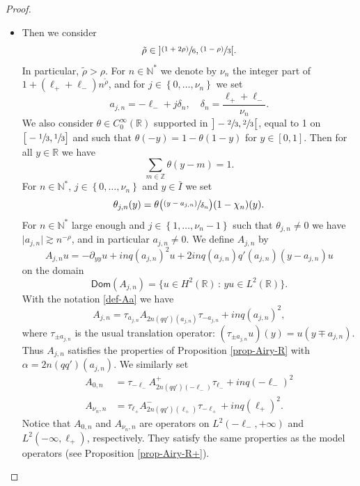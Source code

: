 \documentclass[10pt]{amsart}
\newcommand{\psfrac}[2]{\sfrac{(#1)}{#2}}
\theoremstyle{plain}
\theoremstyle{definition}
\newcommand{\abs}[1]{\vert #1\vert}
\newcommand{\set}[1]{\{ #1\}}
\newcommand{\Ii}[2] {\left\{ #1,\dots,#2 \right\}}
\newcommand{\1}{\mathds 1}
\newcommand{\st}{\,:\,}
\newcommand{\Dom}{\mathsf{Dom}}
\newcommand{\R}{\mathbb{R}}
\newcommand{\N}{\mathbb{N}}
\newcommand{\Z}{\mathbb{Z}}
\let\a\alpha
\let\d\delta
\let\th\theta
\begin{document}
\begin{proof}
\begin{itemize}
\item
Then we consider
\[
\tilde \rho \in {}] \psfrac {1+2\rho} 6, \psfrac {1-\rho} 3[.
\]
In particular, $\tilde \rho > \rho$. For $n \in \N^*$ we denote by $\nu_n$ the integer part of $1+ (\ell_+ + \ell_-) n^{\tilde \rho}$, and for $j \in \Ii 0 {\nu_n}$ we set
\[
a_{j,n} = -\ell_- + j \d_n, \quad \d_n = \frac {\ell_+ + \ell_-}{\nu_n}.
\]
We also consider $\theta \in C_0^\infty(\R)$ supported in $\big]-\sfrac 23,\sfrac 23\big[$, equal to 1 on $\big[-\sfrac 13,\sfrac 13\big]$ and such that $\th(-y) = 1-\th(1-y)$ for $y \in [0,1]$. Then for all $y \in \R$ we have
\[
\sum_{m \in \Z} \theta(y-m) = 1.
\]
For $n \in \N^*$, $j \in \Ii 0 {\nu_n}$ and $y \in \bar I$ we set
\[
\theta_{j,n}(y) = \theta \bigl(\psfrac {y-a_{j,n}}{\d_n} \bigr) (1-\chi_n)(y).
\]
For $n \in \N^*$ large enough and $j \in \Ii 1 {\nu_n-1}$ such that $\th_{j,n} \neq 0$ we have \hbox{$\abs{a_{j,n}} \gtrsim n^{-\rho}$}, and in particular $a_{j,n}\neq 0$. We define $A_{j,n}$ by
\[
A_{j,n} u = -\partial_{yy} u + in q(a_{j,n})^2 u + 2 i n q(a_{j,n}) q'(a_{j,n}) (y-a_{j,n}) u
\]
on the domain
\[
\Dom(A_{j,n}) = \set{u \in H^2(\R) \st y u \in L^2(\R)}.
\]
With the notation \eqref{def-Aa} we have
\[
A_{j,n} = \tau_{a_{j,n}} A_{2n(qq')(a_{j,n})} \tau_{-a_{j,n}} + i n q(a_{j,n})^2,
\]
where $\tau_{\pm a_{j,n}}$ is the usual translation operator: $(\tau_{\pm a_{j,n}} u)(y) = u(y \mp a_{j,n})$. Thus $A_{j,n}$ satisfies the properties of Proposition \ref{prop-Airy-R} with $\a = 2n (qq')(a_{j,n})$. We similarly set
\begin{align*}
A_{0,n} &= \tau_{-\ell_-} A_{2n(qq')(-\ell_-)}^+ \tau_{\ell_-} + i n q(-\ell_-)^2
\\
\tag*{and}
A_{\nu_n,n} &= \tau_{\ell_+} A_{2n(qq')(\ell_+)}^- \tau_{-\ell_+} + i n q(\ell_+)^2.
\end{align*}
Notice that $A_{0,n}$ and $A_{\nu_n,n}$ are operators on $L^2(-\ell_-,+\infty)$ and $L^2(-\infty,\ell_+)$, respectively. They satisfy the same properties as the model operators (see Proposition \ref{prop-Airy-R+}).


\end{itemize}
\end{proof}
\end{document}
